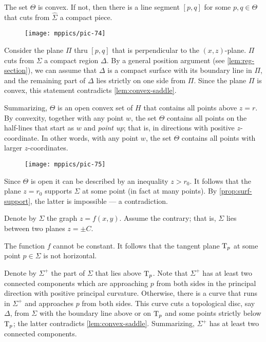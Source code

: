The set $\Theta$ is convex.
If not, then there is a line segment $[p,q]$ for some $p,q\in \Theta$ that cuts from $\hat\Sigma$ a compact piece.
\begin{figure}[!ht]
\vskip-0mm
\centering
\texttt{[image: mppics/pic-74]}
\vskip0mm
\end{figure}
Consider the plane $\Pi$ thru $[p,q]$ that is perpendicular to the $(x,z)$-plane.
$\Pi$ cuts from $\Sigma$ a compact region $\Delta$.
By a general position argument (see \ref{lem:reg-section}),
we can assume that $\Delta$ is a compact surface with its boundary line in $\Pi$, and the remaining part of $\Delta$ lies strictly on one side from $\Pi$.
Since the plane $\Pi$ is convex, this statement contradicts \ref{lem:convex-saddle}.

Summarizing, $\Theta$ is an open convex set of $H$ that contains all points above $z=r$.
By convexity, together with any point $w$, the set $\Theta$ contains all points on the half-lines that start as $w$ and \textit{point up}; that is, in directions with positive $z$-coordinate.
In other words, with any point $w$,
the set $\Theta$ contains all points with larger $z$-coordinates.
\begin{figure}[!ht]
\vskip-0mm
\centering
\texttt{[image: mppics/pic-75]}
\vskip0mm
\end{figure}
Since $\Theta$ is open it can be described by an inequality $z>r_0$.
It follows that the plane $z=r_0$ supports $\Sigma$ at some point (in fact at many points).
By \ref{prop:surf-support}, the latter is impossible --- a contradiction.
\qeds


Denote by $\Sigma$ the graph $z=f(x,y)$.
Assume the contrary; that is, $\Sigma$ lies between two planes $z=\pm C$.

The function $f$ cannot be constant.
It follows that the tangent plane $\mathrm{T}_p$ at some point $p\in\Sigma$ is not horizontal.

Denote by $\Sigma^+$ the part of $\Sigma$ that lies above $\mathrm{T}_p$.
Note that $\Sigma^+$ has at least two connected components which are approaching $p$ from both sides 
in the principal direction with positive principal curvature.
Otherwise, there is a curve that runs in $\Sigma^+$ and approaches $p$ from both sides.
This curve cuts a topological disc, say $\Delta$, from $\Sigma$ with the boundary line above or on $\mathrm{T}_p$ and some points strictly below $\mathrm{T}_p$;
the latter contradicts \ref{lem:convex-saddle}.
Summarizing, $\Sigma^+$ has at least two connected components.

